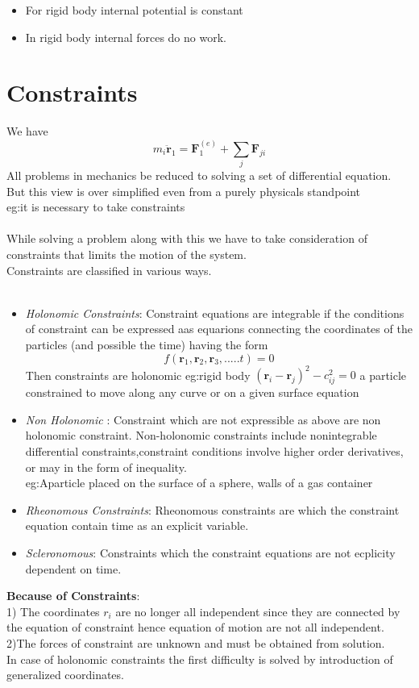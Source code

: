  
\begin{itemize}
	\item For rigid body internal potential is constant
	\item  In rigid body internal forces do no work.
\end{itemize}
\section{Constraints}
We have
$$ m_i\ddot{\mathbf{r}}_1=\textbf{F}_1^{(e)}+\sum\limits_{j}\textbf{F}_{ji}$$
All problems in mechanics be reduced to solving a set of differential equation. But this view is over simplified even from a purely physicals standpoint \\
eg:it is necessary to take constraints\\\\
While solving a problem along with this we have to take consideration of constraints that limits the motion of the system.\\
Constraints are classified in various ways.\\\\
\begin{itemize}
\item \textit{Holonomic Constraints}: Constraint equations are integrable if the conditions of constraint can be expressed aas equarions connecting the coordinates of the particles (and possible the time) having the form
	$$ f(\textbf{r}_1,\textbf{r}_2, \textbf{r}_3,.....t)=0$$
	Then constraints are holonomic
	eg:rigid body $(\textbf{r}_i-\textbf{r}_j)^2-c_{ij}^2=0$
	a particle constrained to move along any curve or on a given surface equation\\
\item \textit{Non Holonomic }:
Constraint which are not expressible as above are non holonomic constraint.
Non-holonomic constraints include nonintegrable differential constraints,constraint conditions involve higher order derivatives, or may in the form of inequality.\\
eg:Aparticle placed on the surface of a sphere, walls of a gas container\\
\item \textit{Rheonomous Constraints}:
Rheonomous constraints are which the constraint equation contain time as an explicit variable.\\
\item \textit{Scleronomous}: 
Constraints which the constraint equations are not ecplicity dependent on time.\\
\end{itemize}
\textbf{Because of Constraints}:\\
1) The coordinates $r_i$ are no longer all independent since they are connected by the equation of constraint hence equation of motion are not all independent.\\
2)The forces of constraint are unknown and must be obtained from solution.\\
In case of holonomic constraints the first difficulty is solved by introduction of generalized coordinates.\\\\
